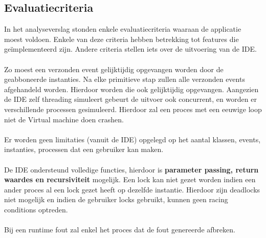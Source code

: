\documentclass[]{article}
\begin{document}
\subsection{Evaluatiecriteria}
In het analyseverslag stonden enkele evaluatiecriteria waaraan de applicatie moest voldoen. Enkele van deze criteria hebben betrekking tot features die ge\"implementeerd zijn. Andere criteria stellen iets over de uitvoering van de IDE. \\\\
Zo moest een verzonden event gelijktijdig opgevangen worden door de geabboneerde instanties. Na elke primitieve stap zullen alle verzonden events afgehandeld worden. Hierdoor worden die ook gelijktijdig opgevangen. Aangezien de IDE zelf threading simuleert gebeurt de uitvoer ook concurrent, en worden er verschillende processen gesimuleerd. Hierdoor zal een proces met een eeuwige loop niet de Virtual machine doen crashen. \\\\
Er worden geen limitaties (vanuit de IDE) opgelegd op het aantal klassen, events, instanties, processen dat een gebruiker kan maken. \\\\
De IDE ondersteund volledige functies, hierdoor is \textbf{parameter passing, return waardes en recursiviteit }mogelijk. Een lock kan niet gezet worden indien een ander proces al een lock gezet heeft op dezelfde instantie. Hierdoor zijn deadlocks niet mogelijk en indien de gebruiker locks gebruikt, kunnen geen racing conditions optreden. \\\\
Bij een runtime fout zal enkel het proces dat de fout genereerde afbreken.
\end{document}
